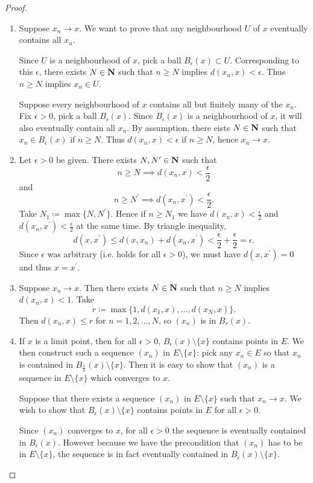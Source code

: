 \begin{proof} \
\begin{enumerate}[label=(\roman*)]
\item \fbox{$\implies$} Suppose $x_n\to x$. We want to prove that any neighbourhood $U$ of $x$ eventually contains all $x_n$.

Since $U$ is a neighbourhood of $x$, pick a ball $B_\epsilon(x)\subset U$. Corresponding to this $\epsilon$, there exists $N\in\mathbf N$ such that $n\ge N$ implies $d(x_n,x)<\epsilon$. Thus $n\ge N$ implies $x_n\in U$.

\fbox{$\impliedby$} Suppose every neighbourhood of $x$ contains all but finitely many of the $x_n$. Fix $\epsilon>0$, pick a ball $B_\epsilon(x)$. Since $B_\epsilon(x)$ is a neighbourhood of $x$, it will also eventually contain all $x_n$. By assumption, there eists $N\in\mathbf N$ such that $x_n\in B_\epsilon(x)$ if $n\ge N$. Thus $d(x_n,x)<\epsilon$ if $n\ge N$, hence $x_n\to x$.

\item Let $\epsilon>0$ be given. There exists $N,N^\prime\in\mathbf N$ such that
\[n\ge N\implies d(x_n,x)<\frac{\epsilon}{2}\]
and
\[n\ge N^\prime\implies d(x_n,x^\prime)<\frac{\epsilon}{2}.\]
Take $N_1\coloneqq\max\{N,N^\prime\}$. Hence if $n\ge N_1$ we have $d(x_n,x)<\frac{\epsilon}{2}$ and $d(x_n,x^\prime)<\frac{\epsilon}{2}$ at the same time. By triangle inequality,
\[ d(x,x^\prime)\le d(x,x_n)+d(x_n,x^\prime)<\frac{\epsilon}{2}+\frac{\epsilon}{2}=\epsilon.\]
Since $\epsilon$ was arbitrary (i.e. holds for all $\epsilon>0$), we must have $d(x,x^\prime)=0$ and thus $x=x^\prime$.

\item Suppose $x_n\to x$. Then there exists $N\in\mathbf N$ such that $n\ge N$ implies $d(x_n,x)<1$. Take
\[r\coloneqq\max\{1,d(x_1,x),\dots,d(x_N,x)\}.\]
Then $d(x_n,x)\le r$ for $n=1,2,\dots,N$, so $(x_n)$ is in $B_r(x)$.

\item \fbox{$\implies$} If $x$ is a limit point, then for all $\epsilon>0$, $B_\epsilon(x)\setminus\{x\}$ contains points in $E$. We then construct such a sequence $(x_n)$ in $E\setminus\{x\}$: pick any $x_n\in E$ so that $x_n$ is contained in $B_\frac{1}{n}(x)\setminus\{x\}$. Then it is easy to show that $(x_n)$ is a sequence in $E\setminus\{x\}$ which converges to $x$.

\fbox{$\impliedby$} Suppose that there exists a sequence $(x_n)$ in $E\setminus\{x\}$ such that $x_n\to x$. We wish to show that $B_\epsilon(x)\setminus\{x\}$ contains points in $E$ for all $\epsilon>0$.

Since $(x_n)$ converges to $x$, for all $\epsilon>0$ the sequence is eventually contained in $B_\epsilon(x)$. However because we have the precondition that $(x_n)$ has to be in $E\setminus\{x\}$, the sequence is in fact eventually contained in $B_\epsilon(x)\setminus\{x\}$.
\end{enumerate}
\end{proof}

